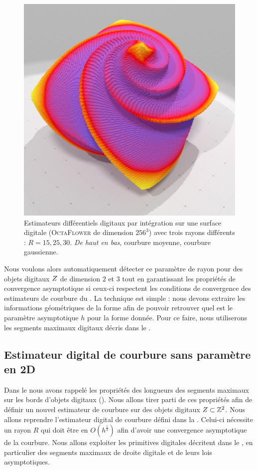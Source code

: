 \begin{figure}[ht]
\begin{center}
  \includegraphics[width=.30\linewidth]{images/Curvature/Octa256_Gauss_R_30_0001}
\end{center}\vspace{-0.5cm}
  \caption{Estimateurs différentiels digitaux par intégration sur une surface digitale (\textsc{OctaFlower} de dimension $256^3$) avec trois rayons différents : $R = 15, 25, 30$. \emph{De haut en bas}, courbure moyenne, courbure gaussienne. \label{fig:digital-II-octa-scale}}
\end{figure}

Nous voulons alors automatiquement détecter ce paramètre de rayon pour des
objets digitaux $Z$ de dimension $2$ et $3$ tout en garantissant les
propriétés de convergence asymptotique si ceux-ci respectent les conditions de
convergence des estimateurs de courbure du .
La technique est simple : nous devons extraire les informations géométriques de
la forme afin de pouvoir retrouver quel est le paramètre asymptotique $h$ pour
la forme donnée. Pour ce faire, nous utiliserons les segments maximaux digitaux décris
dans le .
%
%
\subsection{Estimateur digital de courbure sans paramètre en 2D}

Dans le  nous avons rappelé les propriétés des
longueurs des segments maximaux sur les bords d'objets digitaux
(). Nous allons tirer parti de ces propriétés afin
de définir un nouvel estimateur de courbure sur des objets digitaux
$Z \subset \mathbb{Z}^2$. Nous allons reprendre l'estimateur
digital de courbure défini dans la .
Celui-ci nécessite un rayon $R$ qui doit être en $O(h^{\frac{1}{3}})$ afin
d'avoir une convergence asymptotique de la courbure. Nous allons exploiter les
primitives digitales décritent dans le , en particulier
des segments maximaux de droite digitale et de leurs lois asymptotiques.


